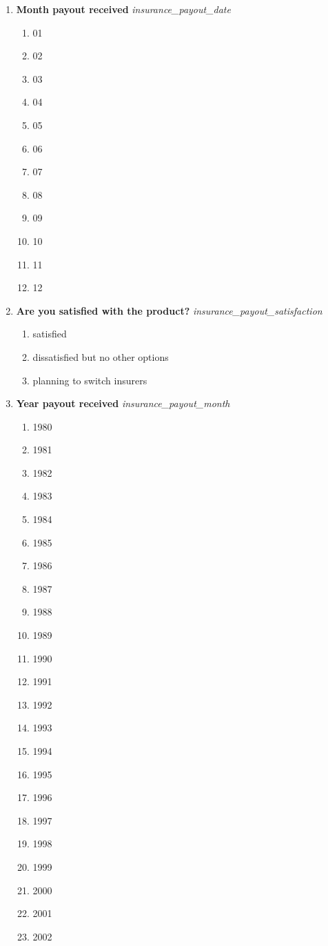 \documentclass{article}
\begin{document}
\begin{enumerate}
\begin{enumerate}[label*=\arabic*.]
\item {\bfseries Month payout received}\emph{ insurance\_payout\_date }
\begin{enumerate}
\item 01
\item 02
\item 03
\item 04
\item 05
\item 06
\item 07
\item 08
\item 09
\item 10
\item 11
\item 12
\end{enumerate}
\item {\bfseries Are you satisfied with the product?}\emph{ insurance\_payout\_satisfaction }
\begin{enumerate}
\item satisfied
\item dissatisfied but no other options
\item planning to switch insurers
\end{enumerate}
\item {\bfseries Year payout received}\emph{ insurance\_payout\_month }
\begin{enumerate}
\item 1980
\item 1981
\item 1982
\item 1983
\item 1984
\item 1985
\item 1986
\item 1987
\item 1988
\item 1989
\item 1990
\item 1991
\item 1992
\item 1993
\item 1994
\item 1995
\item 1996
\item 1997
\item 1998
\item 1999
\item 2000
\item 2001
\item 2002

\end{enumerate}
\end{enumerate}
\end{enumerate}
\end{document}
